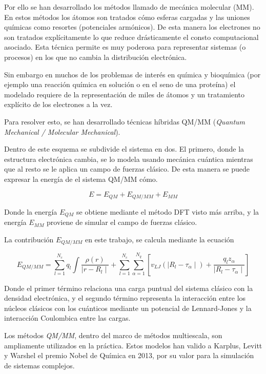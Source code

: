Por ello se han desarrollado los m\'etodos llamado de mec\'anica molecular (MM). En estos m\'etodos los \'atomos son tratados c\'omo esferas cargadas y las uniones qu\'imicas como resortes (potenciales arm\'onicos).
De esta manera los electrones no son tratados expl\'icitamente lo que reduce dr\'asticamente el consto computacional asociado. Esta t\'ecnica permite es muy poderosa para representar sistemas (o procesos) en los que no cambia la distribuci\'on
electr\'onica.

Sin embargo en muchos de los problemas de inter\'es en qu\'imica y bioqu\'imica (por ejemplo una reacci\'on qu\'imica en soluci\'on o en el seno de una prote\'ina)
 el modelado requiere de la representaci\'on de miles de \'atomos y un tratamiento expl\'icito de los electrones a la vez.

Para resolver esto, se han desarrollado t\'ecnicas h\'ibridas QM/MM (\textit{Quantum Mechanical / Molecular Mechanical}).

Dentro de este esquema se subdivide el sistema en dos. El primero, donde la estructura electr\'onica cambia, se lo modela usando mec\'anica cu\'antica mientras que al resto se le aplica un campo de
fuerzas cl\'asico. De esta manera se puede expresar la energ\'ia de el sistema QM/MM c\'omo.

\begin{equation}
    E = E_{QM} + E_{QM/MM} + E_{MM}
\end{equation}

Donde la energ\'ia $E_{QM}$ se obtiene mediante el m\'etodo DFT visto m\'as arriba, y la energ\'ia
$E_{MM}$ proviene de simular el campo de fuerzas cl\'asico.

La contribuci\'on $E_{QM/MM}$ en este trabajo, se calcula mediante la ecuaci\'on

\begin{equation}
    E_{QM/MM} = \sum_{l = 1}^{N_c} q_l \int \frac{\rho(r)}{\mid r - R_l \mid} + \sum_{l = 1}^{N_c}\sum_{\alpha = 1}^{N_q} [ v_{LJ} ( \mid R_l - \tau_\alpha \mid ) + \frac{q_l z_\alpha}{\mid R_l - \tau_\alpha \mid} ]
\end{equation}

Donde el primer t\'ermino relaciona una carga puntual del sistema cl\'asico con la densidad
electr\'onica, y el segundo t\'ermino representa la interacci\'on entre los n\'ucleos cl\'asicos
con los cu\'anticos mediante un potencial de Lennard-Jones y la interacci\'on Coulombica entre
las cargas.

Los m\'etodos \textit{QM/MM}, dentro del marco de m\'etodos multiescala, son ampliamente utilizados en
la pr\'actica. Estos modelos han valido a Karplus, Levitt y
Warshel el premio Nobel de Qu\'imica en 2013, por su valor para la simulaci\'on de sistemas complejos.

